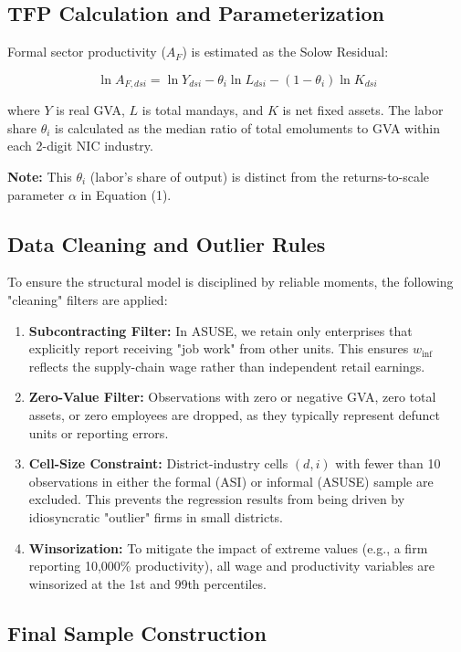 \subsection{TFP Calculation and Parameterization}

Formal sector productivity ($A_F$) is estimated as the Solow Residual:

\[
\ln A_{F,dsi} = \ln Y_{dsi} - \theta_i \ln L_{dsi} - (1-\theta_i) \ln K_{dsi}
\]

where $Y$ is real GVA, $L$ is total mandays, and $K$ is net fixed assets. The labor share $\theta_i$ is calculated as the median ratio of total emoluments to GVA within each 2-digit NIC industry.

\textbf{Note:} This $\theta_i$ (labor's share of output) is distinct from the returns-to-scale parameter $\alpha$ in Equation (1).

\subsection{Data Cleaning and Outlier Rules}

To ensure the structural model is disciplined by reliable moments, the following "cleaning" filters are applied:

\begin{enumerate}
	\item \textbf{Subcontracting Filter:} In ASUSE, we retain only enterprises that explicitly report receiving "job work" from other units. This ensures $w_{\text{inf}}$ reflects the supply-chain wage rather than independent retail earnings.
	\item \textbf{Zero-Value Filter:} Observations with zero or negative GVA, zero total assets, or zero employees are dropped, as they typically represent defunct units or reporting errors.
	\item \textbf{Cell-Size Constraint:} District-industry cells $(d,i)$ with fewer than 10 observations in either the formal (ASI) or informal (ASUSE) sample are excluded. This prevents the regression results from being driven by idiosyncratic "outlier" firms in small districts.
	\item \textbf{Winsorization:} To mitigate the impact of extreme values (e.g., a firm reporting 10,000\% productivity), all wage and productivity variables are winsorized at the 1st and 99th percentiles.
\end{enumerate}

\subsection{Final Sample Construction}


